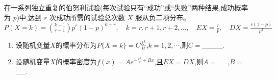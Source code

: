 \documentclass[12pt, a4paper, oneside, UTF8]{ctexbook}
\begin{document}
\begin{tcolorbox}[title=拓展-负二项分布]
    在一系列独立重复的伯努利试验(每次试验只有“成功”或“失败”两种结果,成功概率为 $p$)中,达到 $r$ 次成功所需的试验总次数 $X$ 服从负二项分布。\\
    $P(X=k)=\binom{k-1}{r-1}p^r(1-p)^{k-r},\quad k=r,r+1,r+2,\ldots,\quad EX=\frac{r}{p},\quad DX=\frac{r(1-p)}{p^2}$
\end{tcolorbox}
\begin{enumerate}[label=\arabic*.,start=6]
    \item 设随机变量$X$的概率分布为$P\{X=k\}=C\frac{\lambda^k}{k!}$,$k=1,2,\cdots$,则$C=$\_\_\_\_.
    
    
    \item 设随机变量$X$的概率密度为$f(x)=Ae^{-\frac{x^2}{2}+Bx}$,且$EX=DX$,则$A=$\_\_,$B=$\_\_.
    

\end{enumerate}
\end{document}
